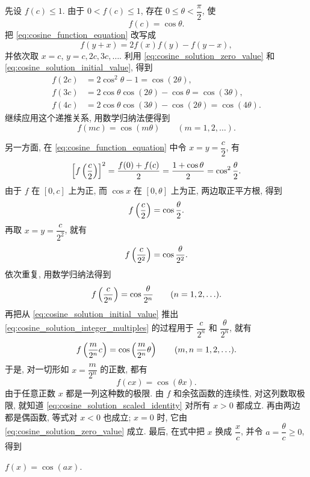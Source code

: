 先设 $f(c)\leq1$. 由于 $0<f(c)\leq1$, 存在
$0\leq\theta<\dfrac\pi2$, 使
\begin{equation}\label{eq:cosine_solution_initial_value}
f(c)=\cos\theta.
\end{equation}
把 \eqref{eq:cosine_function_equation} 改写成
$$
f(y+x)=2f(x)f(y)-f(y-x),
$$
并依次取 $x=c$, $y=c,2c,3c,\ldots$.
利用 \eqref{eq:cosine_solution_zero_value} 和
\eqref{eq:cosine_solution_initial_value}, 得到
\begin{align*}
f(2c)&=2\cos^2\theta-1=\cos(2\theta),\\
f(3c)&=2\cos\theta\cos(2\theta)-\cos\theta=\cos(3\theta),\\
f(4c)&=2\cos\theta\cos(3\theta)-\cos(2\theta)=\cos(4\theta).
\end{align*}
继续应用这个递推关系, 用数学归纳法便得到
\begin{equation}\label{eq:cosine_solution_integer_multiples}
f(mc)=\cos(m\theta)\qquad(m=1,2,\ldots).
\end{equation}

另一方面, 在 \eqref{eq:cosine_function_equation} 中令 $x=y=\dfrac c2$, 有
$$
\left[ f\left( \frac c2 \right) \right]^2
=\frac{f(0)+f(c)}2
=\frac{1+\cos\theta}2
=\cos^2\frac\theta2.
$$
由于 $f$ 在 $[0,c]$ 上为正, 而 $\cos x$ 在 $[0,\theta]$ 上为正,
两边取正平方根, 得到
$$
f\left( \frac c2 \right)=\cos\frac\theta2.
$$
再取 $x=y=\dfrac{c}{2^2}$, 就有
$$
f\left( \frac{c}{2^2} \right)=\cos\frac{\theta}{2^2}.
$$
依次重复, 用数学归纳法得到
\begin{equation}\label{eq:cosine_solution_dyadic_subdivision}
f\left( \frac{c}{2^n} \right)=\cos\frac{\theta}{2^n}
\qquad(n=1,2,\ldots).
\end{equation}
再把从 \eqref{eq:cosine_solution_initial_value} 推出
\eqref{eq:cosine_solution_integer_multiples} 的过程用于
$\dfrac{c}{2^n}$ 和 $\dfrac{\theta}{2^n}$, 就有
$$
f\left( \frac{m}{2^n}c \right)=\cos\left( \frac{m}{2^n}\theta \right)
\qquad(m,n=1,2,\ldots).
$$
于是, 对一切形如 $x=\dfrac{m}{2^n}$ 的正数, 都有
\begin{equation}\label{eq:cosine_solution_scaled_identity}
f(cx)=\cos(\theta x).
\end{equation}
由于任意正数 $x$ 都是一列这种数的极限.
由 $f$ 和余弦函数的连续性, 对这列数取极限,
就知道 \eqref{eq:cosine_solution_scaled_identity} 对所有 $x>0$ 都成立.
再由两边都是偶函数, 等式对 $x<0$ 也成立;
$x=0$ 时, 它由 \eqref{eq:cosine_solution_zero_value} 成立.
最后, 在式中把 $x$ 换成 $\dfrac xc$, 并令 $a=\dfrac\theta c\geq0$, 得到
\begin{center}
$
f(x)=\cos(ax).
$
\end{center}

